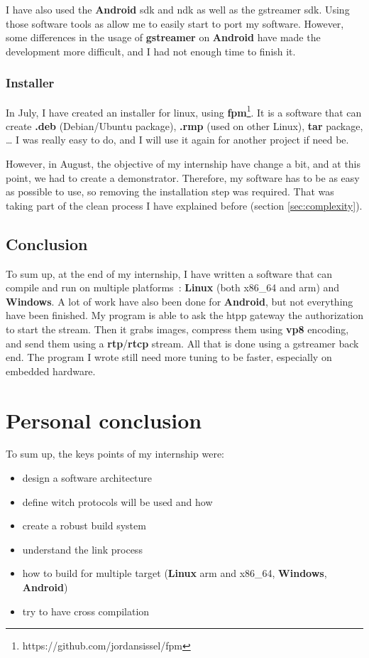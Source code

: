 \documentclass[a4paper,11pt]{custom}
\newcommand{\rtp}{\textbf{rtp}\xspace}
\newcommand{\rtcp}{\textbf{rtcp}\xspace}
\newcommand{\gstreamer}{\textbf{gstreamer}\xspace}
\newcommand{\vpx}{\textbf{vp8}\xspace}
\newcommand{\fpm}{\textbf{fpm}\xspace}
\newcommand{\linux}{\textbf{Linux}\xspace}
\newcommand{\win}{\textbf{Windows}\xspace}
\newcommand{\android}{\textbf{Android}\xspace}
\begin{document}
I have also used the \android{} sdk and ndk as well as the gstreamer sdk. Using
those software tools as allow me to easily start to port my software. However,
some differences in the usage of \gstreamer{} on \android{} have made the
development more difficult, and I had not enough time to finish it.

\subsection{Installer}

In July, I have created an installer for linux, using
\fpm{}\footnote{https://github.com/jordansissel/fpm}. It is a software that can
create \textbf{.deb} (Debian/Ubuntu package), \textbf{.rmp} (used on other
Linux), \textbf{tar} package, … I was really easy to do, and I will use it again
for another project if need be.

However, in August, the objective of my internship have change a bit, and at this
point, we had to create a demonstrator. Therefore, my software has to be as easy
as possible to use, so removing the installation step was required. That was
taking part of the clean process I have explained before (section
\ref{sec:complexity}).

\section{Conclusion}

To sum up, at the end of my internship, I have written a software that can compile
and run on multiple platforms~: \linux{} (both x86_64 and arm) and \win. A lot
of work have also been done for \android, but not everything have been finished.
My program is able to ask the htpp gateway the authorization to start the stream.
Then it grabs images, compress them using \vpx{} encoding, and send them using a
\rtp{}/\rtcp{} stream. All that is done using a gstreamer back end. The program I
wrote still need more tuning to be faster, especially on embedded hardware.

\chapter{Personal conclusion}

To sum up, the keys points of my internship were:
\begin{multicols}{2}
\begin{itemize}
\item design a software architecture
\item define witch protocols will be used and how
\item create a robust build system
\item understand the link process
\item how to build for multiple target (\linux{} arm and x86_64, \win, \android)
\item try to have cross compilation
\end{itemize}
\end{multicols}
\end{document}
